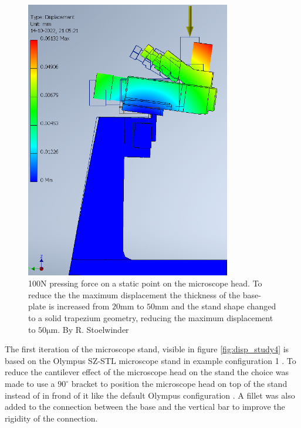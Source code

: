 \documentclass[10pt]{article}
\begin{document}
\begin{figure}[H]
\begin{minipage}[b]{0.45\textwidth}
    \label{fig:disp_study4}
  \end{minipage}
  \hfill
  \begin{minipage}[b]{0.45\textwidth}
    \includegraphics[width=0.8\textwidth]{img/rigidity_simulation/study_7.png}
    \caption{100N pressing force on a static point on the microscope head. To reduce the the maximum displacement the thickness of the base-plate is increased from $20\mathrm{mm}$ to $50\mathrm{mm}$ and the stand shape changed to a solid trapezium geometry, reducing the maximum displacement to $50\mathrm{\mu m}$. By R. Stoelwinder}
    \label{fig:disp_study7}
  \end{minipage}
\end{figure}

The first iteration of the microscope stand, visible in figure \ref{fig:disp_study4} is based on the Olympus SZ-STL microscope stand  in example configuration 1 . 
To reduce the cantilever effect of the microscope head on the stand the choice was made to use a $90^\circ$ bracket to position the microscope head on top of the stand instead of in frond of it like the default Olympus configuration . 
A fillet was also added to the connection between the base and the vertical bar to improve the rigidity of the connection.\\
\end{document}
